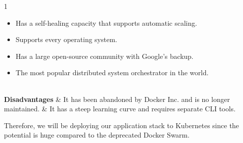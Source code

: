 \begin{table}[H]
\begin{tabularx}{1\textwidth}
\begin{itemize}[leftmargin=*, topsep=0pt, itemsep=1pt, parsep=2pt]
                                                                                                                                                                                                                                                                                  \item Has a self-healing capacity that supports automatic scaling.
                                                                                                                                                                                                                                                                                  \item Supports every operating system.
                                                                                                                                                                                                                                                                                  \item Has a large open-source community with Google's backup.
                                                                                                                                                                                                                                                                                  \item The most popular distributed system orchestrator in the world.
                                                                                                                                                                                                                                                                              \end{itemize}                                                         \\
        \hline
        \textbf {Disadvantages}             & \noindent It has been abandoned by Docker Inc. and is no longer maintained.                                                                                                                                                                                                        & \noindent It has a steep learning curve and requires separate CLI tools. \\
        \hline
    \end{tabularx}
\end{table}
Therefore, we will be deploying our application stack to Kubernetes since the potential is huge compared to the deprecated Docker Swarm.

